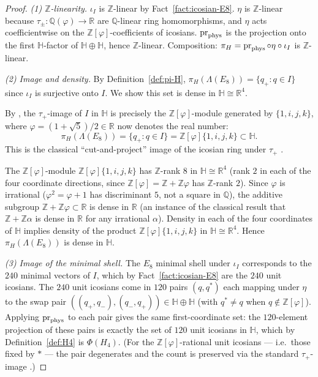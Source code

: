 \documentclass[11pt, a4paper]{amsart}
\theoremstyle{definition}
\newcommand{\R}{\mathbb{R}}
\newcommand{\Q}{\mathbb{Q}}
\newcommand{\Z}{\mathbb{Z}}
\newcommand{\HH}{\mathbb{H}}
\begin{document}
\begin{proof}
\emph{(1) $\Z$-linearity.} $\iota_I$ is $\Z$-linear by
Fact~\ref{fact:icosian-E8}. $\eta$ is $\Z$-linear because $\tau_\pm
\colon \Q(\varphi) \to \R$ are $\Q$-linear ring homomorphisms,
and $\eta$ acts coefficientwise on the $\Z[\varphi]$-coefficients
of icosians. $\operatorname{pr}_{\rm phys}$ is the projection onto
the first $\HH$-factor of $\HH \oplus \HH$, hence $\Z$-linear.
Composition: $\pi_H = \operatorname{pr}_{\rm phys} \circ \eta \circ
\iota_I$ is $\Z$-linear.

\emph{(2) Image and density.} By Definition~\ref{def:pi-H},
$\pi_H(\Lambda(E_8)) = \{q_+ : q \in I\}$ since $\iota_I$ is
surjective onto $I$. We show this set is dense in $\HH \cong \R^4$.

By \cite[Theorem~4.1 and Proposition~4.2]{MoodyPatera}, the
$\tau_+$-image of $I$ in $\HH$ is precisely the
$\Z[\varphi]$-module generated by $\{1, i, j, k\}$, where
$\varphi = (1+\sqrt 5)/2 \in \R$ now denotes the real number:
\[
  \pi_H(\Lambda(E_8)) = \{q_+ : q \in I\} =
    \Z[\varphi]\{1, i, j, k\} \subset \HH.
\]
This is the classical ``cut-and-project'' image of the icosian
ring under $\tau_+$ \cite[\S 4.1]{MoodyPatera}.

The $\Z[\varphi]$-module $\Z[\varphi]\{1, i, j, k\}$ has
$\Z$-rank $8$ in $\HH \cong \R^4$ (rank $2$ in each of the four
coordinate directions, since $\Z[\varphi] = \Z + \Z\varphi$ has
$\Z$-rank $2$). Since $\varphi$ is irrational
($\varphi^2 = \varphi + 1$ has discriminant $5$, not a square in
$\Q$), the additive subgroup $\Z + \Z\varphi \subset \R$ is dense
in $\R$ \cite[Theorem~A.1]{MoodyPatera} (an instance of the
classical result that $\Z + \Z\alpha$ is dense in $\R$ for any
irrational $\alpha$). Density in each of the four coordinates of
$\HH$ implies density of the product $\Z[\varphi]\{1, i, j, k\}$
in $\HH \cong \R^4$. Hence $\pi_H(\Lambda(E_8))$ is dense in
$\HH$.

\emph{(3) Image of the minimal shell.} The $E_8$ minimal shell
under $\iota_I$ corresponds to the $240$ minimal vectors of $I$,
which by Fact~\ref{fact:icosian-E8} are the $240$ unit icosians.
The $240$ unit icosians come in $120$ pairs $(q, q^\ast)$ each
mapping under $\eta$ to the swap pair $((q_+, q_-), (q_-, q_+))
\in \HH \oplus \HH$ (with $q^\ast \neq q$ when $q \notin
\Z[\varphi]$). Applying $\operatorname{pr}_{\rm phys}$ to each
pair gives the same first-coordinate set: the $120$-element
projection of these pairs is exactly the set of $120$ unit
icosians in $\HH$, which by Definition~\ref{def:H4} is
$\Phi(H_4)$. (For the $\Z[\varphi]$-rational unit icosians ---
i.e.\ those fixed by $\ast$ --- the pair degenerates and the count
is preserved via the standard $\tau_+$-image \cite[\S 4.1,
Eq.~(4.5)]{MoodyPatera}.)
\end{proof}
\end{document}
